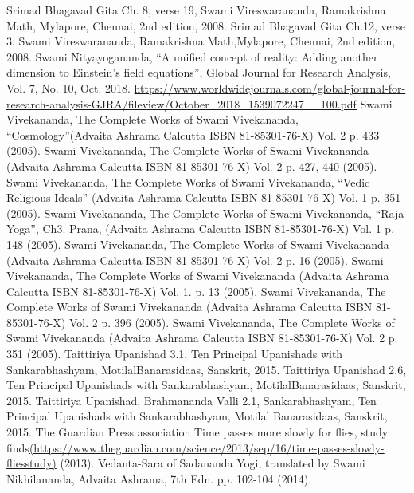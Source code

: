 \documentclass[twoside, 13pt]{article}
\begin{document}
{{{\begin{thebibliography}{99}
\newpage
\bibitem{} Srimad Bhagavad Gita Ch. 8, verse 19, Swami Vireswarananda, Ramakrishna Math, Mylapore, Chennai, 2nd edition, 2008.
\bibitem{} Srimad Bhagavad Gita Ch.12, verse 3. Swami Vireswarananda, Ramakrishna Math,\break Mylapore, Chennai, 2nd edition, 2008.
\bibitem{} Swami Nityayogananda, “A unified concept of reality: Adding another dimension to Einstein’s field equations”, Global Journal for Research Analysis, Vol. 7, No. 10, Oct. 2018.
\bibitem{} \url{https://www.worldwidejournals.com/global-journal-for-research-analysis-GJRA/fileview/October_2018_1539072247__100.pdf}
\bibitem{} Swami Vivekananda, The Complete Works of Swami Vivekananda, “Cosmology”\break (Advaita Ashrama Calcutta ISBN 81-85301-76-X) Vol. 2 p. 433 (2005).
\bibitem{} Swami Vivekananda, The Complete Works of Swami Vivekananda (Advaita Ashrama Calcutta ISBN 81-85301-76-X) Vol. 2 p. 427, 440 (2005).
\bibitem{} Swami Vivekananda, The Complete Works of Swami Vivekananda, “Vedic Religious Ideals” (Advaita Ashrama Calcutta ISBN 81-85301-76-X) Vol. 1 p. 351 (2005).
\bibitem{} Swami Vivekananda, The Complete Works of Swami Vivekananda, “Raja-Yoga”, Ch3. Prana, (Advaita Ashrama Calcutta ISBN 81-85301-76-X) Vol. 1 p. 148 (2005).
\bibitem{} Swami Vivekananda, The Complete Works of Swami Vivekananda (Advaita Ashrama Calcutta ISBN 81-85301-76-X) Vol. 2 p. 16 (2005).
\bibitem{} Swami Vivekananda, The Complete Works of Swami Vivekananda (Advaita Ashrama Calcutta ISBN 81-85301-76-X) Vol. 1. p. 13 (2005).
\bibitem{} Swami Vivekananda, The Complete Works of Swami Vivekananda (Advaita Ashrama Calcutta ISBN 81-85301-76-X) Vol. 2 p. 396 (2005).
\bibitem{} Swami Vivekananda, The Complete Works of Swami Vivekananda (Advaita Ashrama Calcutta ISBN 81-85301-76-X) Vol. 2 p. 351 (2005).
\bibitem{} Taittiriya Upanishad 3.1, Ten Principal Upanishads with Sankarabhashyam, Motilal\break Banarasidaas, Sanskrit, 2015.
\bibitem{} Taittiriya Upanishad 2.6, Ten Principal Upanishads with Sankarabhashyam, Motilal\break Banarasidaas, Sanskrit, 2015.
\bibitem{} Taittiriya Upanishad, Brahmananda Valli 2.1, Sankarabhashyam, Ten Principal Upanishads with Sankarabhashyam, Motilal Banarasidaas, Sanskrit, 2015.
\bibitem{} The Guardian Press association Time passes more slowly for ﬂies, study ﬁnds\break \url{(https://www.theguardian.com/science/2013/sep/16/time-passes-slowly-ﬂiesstudy)} (2013).
\bibitem{} Vedanta-Sara of Sadananda Yogi, translated by Swami Nikhilananda, Advaita Ashrama, 7th Edn. pp. 102-104 (2014).


\end{thebibliography}}}}
\end{document}
